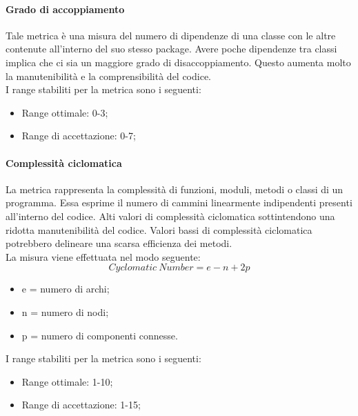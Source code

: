 			\paragraph{Grado di accoppiamento}
			Tale metrica è una misura del numero di dipendenze di una classe con le altre contenute all'interno del suo stesso package. Avere poche dipendenze tra classi implica che ci sia un maggiore grado di disaccoppiamento. Questo aumenta molto la manutenibilità e la comprensibilità del codice.
			\\I range stabiliti per la metrica sono i seguenti:
			\begin{itemize}
				\item Range ottimale: 0-3;
				\item Range di accettazione: 0-7;
			\end{itemize}
			
			\paragraph{Complessità ciclomatica}
			La metrica rappresenta la complessità di funzioni, moduli, metodi o classi di un programma. Essa esprime il numero di cammini linearmente indipendenti presenti all'interno del codice. Alti valori di complessità ciclomatica sottintendono una ridotta manutenibilità del codice. Valori bassi di complessità ciclomatica potrebbero delineare una scarsa efficienza dei metodi.
			\\La misura viene effettuata nel modo seguente:
			\begin{equation}
			Cyclomatic \ Number = e - n + 2p
			\end{equation}
			\begin{itemize}
				\item e = numero di archi;
				\item n = numero di nodi;
				\item p = numero di componenti connesse.
		    \end{itemize}
			I range stabiliti per la metrica sono i seguenti:
			\begin{itemize}
				\item Range ottimale: 1-10;
				\item Range di accettazione: 1-15;
			\end{itemize}
			
